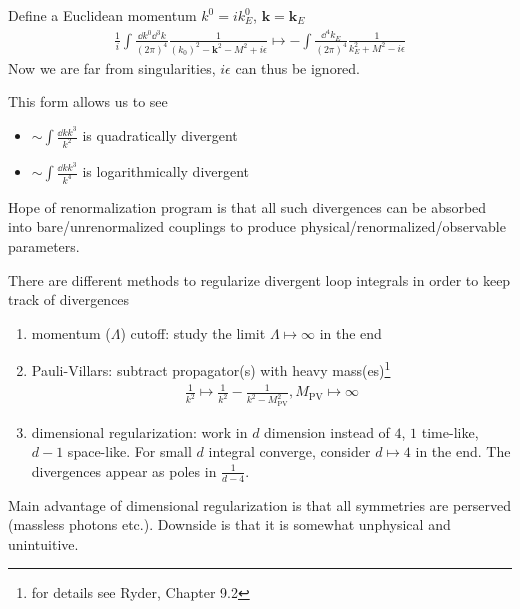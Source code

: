 Define a Euclidean momentum $k^0 = ik_E^0$, $\pmb{k} = \pmb{k}_E$
\begin{align*}
	\frac{1}{i}\int \frac{\dd k^0 \dd^3 k}{(2\pi)^4} \frac{1}{(k_0)^2 - \pmb{k}^2 - M^2 +i\epsilon} \longmapsto - \int \frac{\dd^4 k_E}{(2\pi)^4} \frac{1}{k^2_E + M^2 -i\epsilon}
\end{align*}
Now we are far from singularities, $i\epsilon$ can thus be ignored.

This form allows us to see
\begin{itemize}[label={}]
	\item 
{} 
$\sim \int \frac{\dd k k^3}{k^2}$ is quadratically divergent

\item
{}
$\sim \int \frac{\dd k k^3}{k^4}$ is logarithmically divergent
\end{itemize}

Hope of renormalization program is that all such divergences can be absorbed into bare/unrenormalized couplings to produce physical/renormalized/observable parameters.

There are different methods to regularize divergent loop integrals in order to keep track of divergences
\begin{enumerate}
	\item momentum ($\Lambda$) cutoff: study the limit $\Lambda \longmapsto \infty$ in the end
	\item Pauli-Villars: subtract propagator(s) with heavy mass(es)\footnote{for details see Ryder, Chapter 9.2}
		\begin{align*}
			\frac{1}{k^2} \longmapsto \frac{1}{k^2} - \frac{1}{k^2 - M^2_\text{PV}}, M_\text{PV} \longmapsto \infty
		\end{align*}
	\item dimensional regularization: work in $d$ dimension instead of $4$, $1$ time-like, $d-1$ space-like. For small $d$ integral converge, consider $d \longmapsto 4$ in the end. The divergences appear as poles in $\frac{1}{d-4}$.
\end{enumerate}
Main advantage of dimensional regularization is that all symmetries are perserved (massless photons etc.). Downside is that it is somewhat unphysical and unintuitive.

